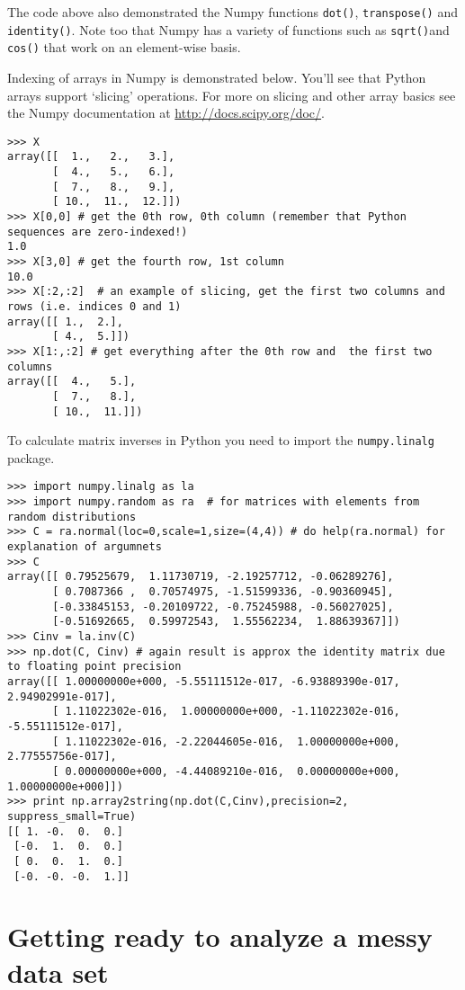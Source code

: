 The code above also demonstrated the Numpy functions \lstinline!dot()!,
\lstinline!transpose()! and \lstinline!identity()!. Note too that Numpy
has a variety of functions such as \lstinline!sqrt()!and
\lstinline!cos()! that work on an element-wise basis.

Indexing of arrays in Numpy is demonstrated below. You'll see that
Python arrays support `slicing' operations. For more on slicing and
other array basics see the Numpy documentation at
\href{http://docs.scipy.org/doc/}{http://docs.scipy.org/doc/}.

\begin{lstlisting}
>>> X
array([[  1.,   2.,   3.],
       [  4.,   5.,   6.],
       [  7.,   8.,   9.],
       [ 10.,  11.,  12.]])
>>> X[0,0] # get the 0th row, 0th column (remember that Python sequences are zero-indexed!)
1.0
>>> X[3,0] # get the fourth row, 1st column
10.0
>>> X[:2,:2]  # an example of slicing, get the first two columns and rows (i.e. indices 0 and 1)
array([[ 1.,  2.],
       [ 4.,  5.]])
>>> X[1:,:2] # get everything after the 0th row and  the first two columns
array([[  4.,   5.],
       [  7.,   8.],
       [ 10.,  11.]])
\end{lstlisting}
To calculate matrix inverses in Python you need to import the
\lstinline!numpy.linalg! package.

\begin{lstlisting}
>>> import numpy.linalg as la
>>> import numpy.random as ra  # for matrices with elements from random distributions
>>> C = ra.normal(loc=0,scale=1,size=(4,4)) # do help(ra.normal) for explanation of argumnets
>>> C
array([[ 0.79525679,  1.11730719, -2.19257712, -0.06289276],
       [ 0.7087366 ,  0.70574975, -1.51599336, -0.90360945],
       [-0.33845153, -0.20109722, -0.75245988, -0.56027025],
       [-0.51692665,  0.59972543,  1.55562234,  1.88639367]])
>>> Cinv = la.inv(C)
>>> np.dot(C, Cinv) # again result is approx the identity matrix due to floating point precision
array([[ 1.00000000e+000, -5.55111512e-017, -6.93889390e-017,  2.94902991e-017],
       [ 1.11022302e-016,  1.00000000e+000, -1.11022302e-016, -5.55111512e-017],
       [ 1.11022302e-016, -2.22044605e-016,  1.00000000e+000,  2.77555756e-017],
       [ 0.00000000e+000, -4.44089210e-016,  0.00000000e+000,  1.00000000e+000]])
>>> print np.array2string(np.dot(C,Cinv),precision=2, suppress_small=True)
[[ 1. -0.  0.  0.]
 [-0.  1.  0.  0.]
 [ 0.  0.  1.  0.]
 [-0. -0. -0.  1.]]
\end{lstlisting}


\section{Getting ready to analyze a messy data set}

